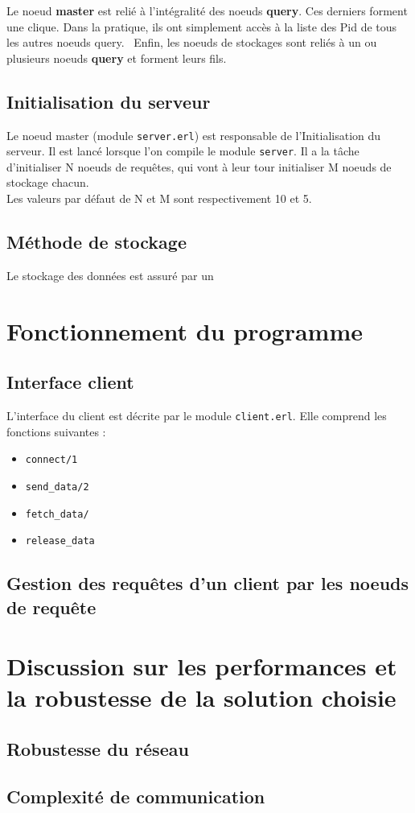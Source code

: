 \documentclass[a4paper]{report}
\begin{document}
Le noeud \textbf{master} est relié à l'intégralité des noeuds \textbf{query}. Ces derniers
forment une clique. Dans la pratique, ils ont simplement accès à la liste des Pid de tous les autres noeuds query. \
Enfin, les noeuds de stockages sont reliés à un ou plusieurs noeuds \textbf{query} et forment leurs fils.

\section{Initialisation du serveur}

Le noeud master (module \texttt{server.erl}) est responsable de l'Initialisation du serveur. Il est lancé lorsque l'on
compile le module \texttt{server}. Il a la tâche d'initialiser N noeuds de requêtes, qui vont à leur tour initialiser M noeuds de stockage chacun. \\
Les valeurs par défaut de N et M sont respectivement 10 et 5.

\section{Méthode de stockage}
Le stockage des données est assuré par un

\chapter{Fonctionnement du programme}
\label{chap:fonctionnement}

\section{Interface client}

L'interface du client est décrite par le module \texttt{client.erl}. Elle comprend les fonctions suivantes :
\begin{itemize}
    \item \texttt{connect/1}
    \item \texttt{send\_data/2}
    \item \texttt{fetch\_data/}
    \item \texttt{release\_data}
\end{itemize}

\section{Gestion des requêtes d'un client par les noeuds de requête}

\chapter{Discussion sur les performances et la robustesse de la solution choisie}
\label{chap:discussion}

\section{Robustesse du réseau}

\section{Complexité de communication}
\end{document}
